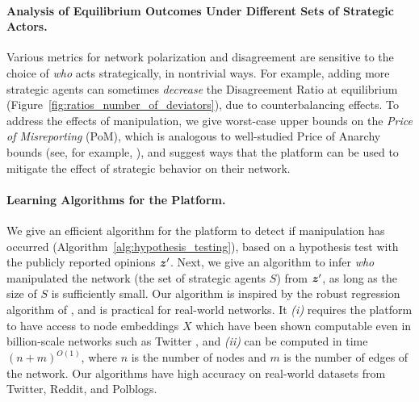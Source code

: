 \paragraph{Analysis of Equilibrium Outcomes Under Different Sets of Strategic Actors.} Various metrics for network polarization and disagreement are sensitive to the choice of {\em who} acts strategically, in nontrivial ways. For example, adding more strategic agents can sometimes {\em decrease} the Disagreement Ratio at equilibrium (Figure~\ref{fig:ratios_number_of_deviators}), due to  counterbalancing effects. 
To address the effects of manipulation, we give worst-case upper bounds on the \textit{Price of Misreporting} (PoM), which is analogous to well-studied Price of Anarchy bounds (see, for example, \citet{bhawalkar2013,roughgarden2011local}), and suggest ways that the platform can be used to mitigate the effect of strategic behavior on their network. 

\paragraph{Learning Algorithms for the Platform.} We give  an efficient algorithm for the platform to detect if manipulation has occurred (Algorithm~\ref{alg:hypothesis_testing}), based on a hypothesis test with the publicly reported opinions $\bm{z}^\prime$. Next, we give an algorithm to infer {\em who} manipulated the network (the set of strategic agents $S$)  from $\bm{z}^\prime$, as long as the size of $S$ is sufficiently small. Our algorithm is inspired by the robust regression algorithm of \citet{torrent-2015}, and is practical for real-world networks. It  \textit{(i)} requires the platform to have access to node embeddings $X$ which have been shown computable even in billion-scale networks such as Twitter \citep{el2022twhin}, and \textit{(ii)} can be computed in time $(n + m)^{O(1)}$, where $n$ is the number of nodes and $m$ is the number of edges of the network. Our algorithms have high accuracy on real-world datasets from Twitter, Reddit, and Polblogs. 




